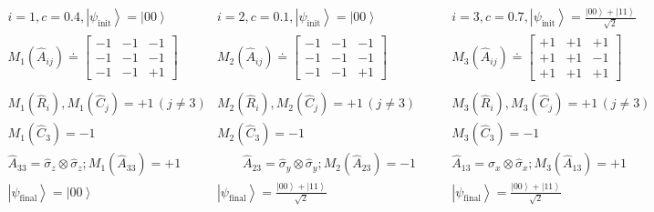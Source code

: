 \documentclass[british,aps,prl,superscriptaddress,nofootinbib,times,reprint]{revtex4-1}
\theoremstyle{plain}
\theoremstyle{plain}
\theoremstyle{definition}
\theoremstyle{remark}
\theoremstyle{remark}
\theoremstyle{remark}
\theoremstyle{plain}
\theoremstyle{plain}
\theoremstyle{plain}
\theoremstyle{definition}
\theoremstyle{definition}
\begin{document}
\begin{table}
 \begin{equation*}
\begin{array}{ccc} 
i=1,c=0.4,\left|\psi_{\text{init}}\right\rangle=\left|00\right\rangle & i=2,c=0.1,\left|\psi_{\text{init}}\right\rangle=\left|00\right\rangle & i=3,c=0.7,\left|\psi_{\text{init}}\right\rangle=\frac{\left|00\right\rangle +\left|11\right\rangle}{\sqrt{2}} \\

M_{1}(\hat{A}_{ij})\doteq\left[\begin{array}{ccc} -1 & -1 & -1\\ -1 & -1 & -1\\ -1 & -1 & +1\end{array}\right] &
M_{2}(\hat{A}_{ij})\doteq\left[\begin{array}{ccc}-1 & -1 & -1\\ -1 & -1 & -1\\ -1 & -1 & +1\end{array}\right] &
M_{3}(\hat{A}_{ij})\doteq\left[\begin{array}{ccc}+1 & +1 & +1\\ +1 & +1 & -1\\ +1 & +1 & +1\end{array}\right]\\ \\


M_{1}(\hat{R}_{i}),M_{1}(\hat{C}_{j})=+1\,(j\neq3) &
M_{2}(\hat{R}_{i}),M_{2}(\hat{C}_{j})=+1\,(j\neq3) &
M_{3}(\hat{R}_{i}),M_{3}(\hat{C}_{j})=+1\,(j\neq3)\\

M_{1}(\hat{C}_{3})=-1 & M_{2}(\hat{C}_{3})=-1 & M_{3}(\hat{C}_{3})=-1\\ 


\hat{A}_{33}=\hat{\sigma}_{z}\otimes\hat{\sigma}_{z};M_{1}(\hat{A}_{33})=+1&
\quad\quad\hat{A}_{23}=\hat{\sigma}_{y}\otimes\hat{\sigma}_{y};M_{2}(\hat{A}_{23})=-1\quad\quad&
\hat{A}_{13}=\hat{\sigma}_{x}\otimes\hat{\sigma}_{x};M_{3}(\hat{A}_{13})=+1\\

\left|\psi_{\text{final}}\right\rangle = \left|00\right\rangle  & \left|\psi_{\text{final}}\right\rangle = \frac{\left|00\right\rangle +\left|11\right\rangle}{\sqrt{2}} & \left|\psi_{\text{final}}\right\rangle = \frac{\left|00\right\rangle+\left|11\right\rangle }{\sqrt{2}}


\end{array}
\end{equation*}
\end{table}
\end{document}
